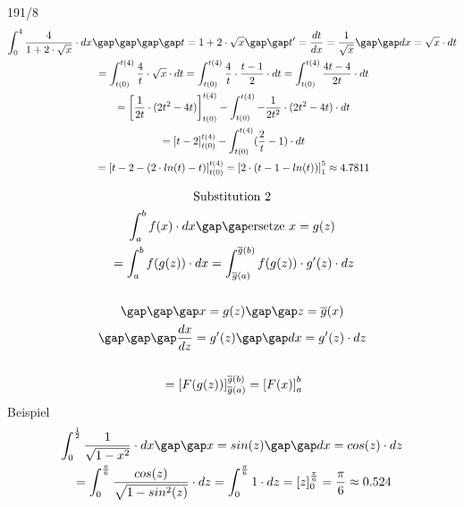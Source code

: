 \begin{exercise}{191/8}
\begin{gather*}
    \int_0^4 \frac{4}{1 + 2 \cdot \sqrt{x}} \cdot dx \gap\gap\gap\gap t = 1 + 2 \cdot \sqrt{x} \gap\gap t' = \frac{dt}{dx} = \frac{1}{\sqrt{x}} \gap\gap dx = \sqrt{x} \cdot dt \\
    \;= \int_{t(0)}^{t(4)} \frac{4}{t} \cdot \sqrt{x} \cdot dt = \int_{t(0)}^{t(4)} \frac{4}{t} \cdot \frac{t - 1}{2} \cdot dt = \int_{t(0)}^{t(4)} \frac{4t - 4}{2t} \cdot dt \\
    \;= \left[\frac{1}{2t} \cdot (2t^2 - 4t)\right]_{t(0)}^{t(4)} - \int_{t(0)}^{t(4)} - \frac{1}{2t^2} \cdot (2t^2 - 4t) \cdot dt \\
    \;= \left[t - 2\right]_{t(0)}^{t(4)} - \int_{t(0)}^{t(4)} (\frac{2}{t} - 1) \cdot dt \\
    \;= \left[t - 2 - (2 \cdot ln(t) - t)\right]_{t(0)}^{t(4)} = \left[2 \cdot (t - 1 - ln(t))\right]_1^5 \approx 4.7811
  \end{gather*}
\end{exercise}
\begin{gather*}
  \text{Substitution 2} \\
  \int_a^b f(x) \cdot dx \gap\gap \text{ersetze } x = g(z) \\
  \;= \int_a^b f(g(z)) \cdot dx = \int_{\overline{g}(a)}^{\overline{g}(b)} f(g(z)) \cdot g'(z) \cdot dz \\\\
  \gap\gap\gap x = g(z) \gap\gap z = \overline{g}(x) \\
  \gap\gap\gap \frac{dx}{dz} = g'(z) \gap\gap dx = g'(z) \cdot dz \\\\
  \;= \left[F(g(z))\right]_{\overline{g}(a)}^{\overline{g}(b)} = \left[F(x)\right]_a^b
\end{gather*}
Beispiel
\begin{gather*}
  \int_0^\frac{1}{2} \frac{1}{\sqrt{1 - x^2}} \cdot dx \gap\gap x = sin(z) \gap\gap dx = cos(z) \cdot dz \\
  \;= \int_0^\frac{\pi}{6} \frac{cos(z)}{\sqrt{1 - sin^2(z)}} \cdot dz = \int_0^\frac{\pi}{6} 1 \cdot dz = \left[z\right]_0^\frac{\pi}{6} = \frac{\pi}{6} \approx 0.524
\end{gather*}

